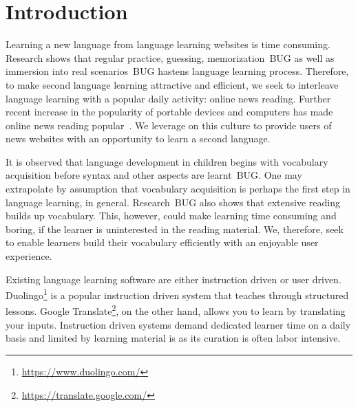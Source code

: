\section{Introduction}
Learning a new language from language learning websites is 
time consuming. Research shows that regular practice, guessing, 
memorization~\cite{rubin91}BUG as well as immersion into real 
scenarios~\cite{naiman78}BUG hastens language learning process. 
Therefore, to make second language learning 
attractive and efficient, we seek to interleave language learning 
with a popular daily activity: online news reading.
Further recent increase in the popularity of 
portable devices and computers has made online news reading 
popular~\cite{yarlh2012}. We leverage on this culture to provide 
users of news websites with an opportunity to learn a second language.

It is observed that language development in children begins with 
vocabulary acquisition before syntax and other aspects are learnt~\cite{}BUG. 
One may extrapolate by assumption that vocabulary acquisition is perhaps 
the first step in language learning, in general. Research~\cite{}BUG also 
shows that extensive reading builds up vocabulary. This, however, could 
make learning time consuming and boring, if the learner is uninterested 
in the reading material. We, therefore, seek to enable learners build 
their vocabulary efficiently with an enjoyable user experience.


Existing language learning software are either instruction driven or user driven. 
Duolingo\footnote{\url{https://www.duolingo.com/}} is a popular instruction driven system 
that teaches through structured lessons. Google Translate\footnote{\url{https://translate.google.com/}}, 
on the other hand, allows you to learn by translating your inputs. Instruction 
driven systems demand dedicated learner time on a daily basis and
limited by learning material is as its curation is often labor intensive.

